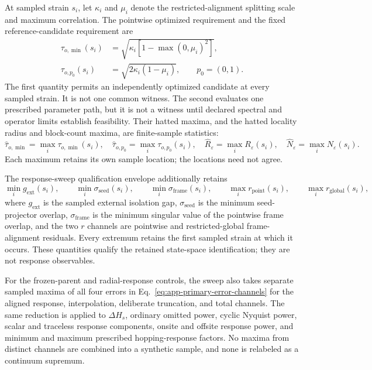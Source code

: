 At sampled strain $s_i$, let $\kappa_i$ and $\mu_i$ denote the restricted-alignment
splitting scale and maximum correlation. The pointwise optimized requirement and the
fixed reference-candidate requirement are
\begin{align}
 \tau_{o,\min}(s_i)
 &=\sqrt{\kappa_i[1-\max(0,\mu_i)^2]},\\
 \tau_{o,p_0}(s_i)
 &=\sqrt{2\kappa_i(1-\mu_i)},
 \qquad p_0=(0,1).
 \label{eq:app-strain-candidate-requirements}
\end{align}
The first quantity permits an independently optimized candidate at every sampled
strain. It is not one common witness. The second evaluates one prescribed parameter
path, but it is not a witness until declared spectral and operator limits establish
feasibility. Their hatted maxima, and the hatted locality radius and block-count maxima,
are finite-sample statistics:
\begin{equation}
 \widehat\tau_{o,\min}=\max_i\tau_{o,\min}(s_i),\quad
 \widehat\tau_{o,p_0}=\max_i\tau_{o,p_0}(s_i),\quad
 \widehat R_\varepsilon=\max_iR_\varepsilon(s_i),\quad
 \widehat N_\varepsilon=\max_iN_\varepsilon(s_i).
 \label{eq:app-strain-sampled-envelopes}
\end{equation}
Each maximum retains its own sample location; the locations need not agree.

The response-sweep qualification envelope additionally retains
\begin{equation}
 \min_i g_{\mathrm{ext}}(s_i),\qquad
 \min_i\sigma_{\mathrm{seed}}(s_i),\qquad
 \min_i\sigma_{\mathrm{frame}}(s_i),\qquad
 \max_i r_{\mathrm{point}}(s_i),\qquad
 \max_i r_{\mathrm{global}}(s_i),
 \label{eq:app-strain-qualification-envelope}
\end{equation}
where $g_{\mathrm{ext}}$ is the sampled external isolation gap,
$\sigma_{\mathrm{seed}}$ is the minimum seed-projector overlap,
$\sigma_{\mathrm{frame}}$ is the minimum singular value of the pointwise frame overlap,
and the two $r$ channels are pointwise and restricted-global frame-alignment residuals.
Every extremum retains the first sampled strain at which it occurs. These quantities
qualify the retained state-space identification; they are not response observables.

For the frozen-parent and radial-response controls, the sweep also takes separate sampled
maxima of all four errors in Eq.~\eqref{eq:app-primary-error-channels} for the aligned
response, interpolation, deliberate truncation, and total channels. The same reduction
is applied to $\Delta H_s$, ordinary omitted power, cyclic Nyquist power, scalar and
traceless response components, onsite and offsite response power, and minimum and
maximum prescribed hopping-response factors. No maxima from distinct channels are
combined into a synthetic sample, and none is relabeled as a continuum supremum.

